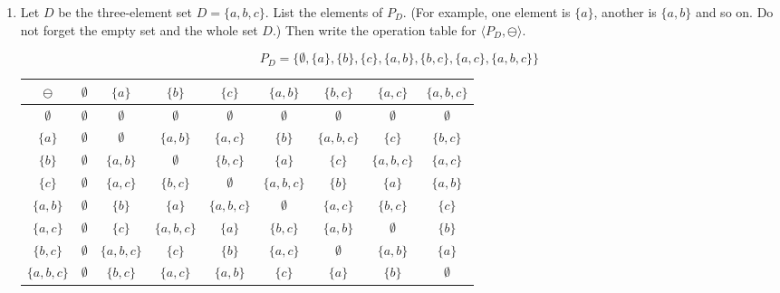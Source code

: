 \documentclass[twoside]{amsart}
\begin{document}
\begin{enumerate}[A.]
\begin{enumerate}[1.]
   \item Let $D$ be the three-element set $D = \{a,b,c\}$. List the elements
   of $P_D$. (For example, one element is $\{a\}$, another is $\{a,b\}$ and 
   so on. Do not forget the empty set and the whole set $D$.) Then
   write the operation table for $\langle P_D,\ominus \rangle$.

   \begin{center}
      $$ P_D = \{ \emptyset, \{a\}, \{b\}, \{c\}, \{a,b\}, \{b,c\}, 
                  \{a,c\}, \{a,b,c\} \} $$
   \end{center}

   \begin{center}
   \scalebox{.9}
   {\begin{tabular}{c|cccccccc}
      $\ominus$ & $\emptyset$ & $\{a\}$ & $\{b\}$ & $\{c\}$ & $\{a,b\}$ & 
          $\{b,c\}$ & $\{a,c\}$ & $\{a,b,c\}$  \\ \hline
      $\emptyset$ & $\emptyset$ & $\emptyset$ & $\emptyset$ & $\emptyset$ 
                  & $\emptyset$ & $\emptyset$ & $\emptyset$ & $\emptyset$\\
      $\{a\}$ & $\emptyset$ & $\emptyset$ & $\{a,b\}$ & $\{a,c\}$ & $\{b\}$ &
         $\{a,b,c\}$ & $\{c\}$ & $\{b,c\}$\\
      $\{b\}$ & $\emptyset$ & $\{a,b\}$ & $\emptyset$ & $\{b,c\}$ & $\{a\}$ &
         $\{c\}$ & $\{a,b,c\}$ & $\{a,c\}$ \\
      $\{c\}$ & $\emptyset$ & $\{a,c\}$ & $\{b,c\}$ & $\emptyset$ 
         & $\{a,b,c\}$ & $\{b\}$ & $\{a\}$ & $\{a,b\}$ \\
      $\{a,b\}$ & $\emptyset$ & $\{b\}$ & $\{a\}$ & $\{a,b,c\}$ & $\emptyset$ 
         & $\{a,c\}$ & $\{b,c\}$ & $\{c\}$ \\
      $\{a,c\}$ & $\emptyset$ & $\{c\}$ & $\{a,b,c\}$ & $\{a\}$ & $\{b,c\}$ 
         & $\{a,b\}$ & $\emptyset$ & $\{b\}$\\
      $\{b,c\}$ & $\emptyset$ & $\{a,b,c\}$ & $\{c\}$ & $\{b\}$ & $\{a,c\}$
         & $\emptyset$ & $\{a,b\}$ & $\{a\}$ \\
      $\{a,b,c\}$ & $\emptyset$ & $\{b,c\}$ & $\{a,c\}$ & $\{a,b\}$ & $\{c\}$ 
         & $\{a\}$ & $\{b\}$ & $\emptyset$\\
   \end{tabular}}
   \end{center}
   
   \begin{verbatim}

   \end{verbatim}


\end{enumerate}
\end{enumerate}
\end{document}
